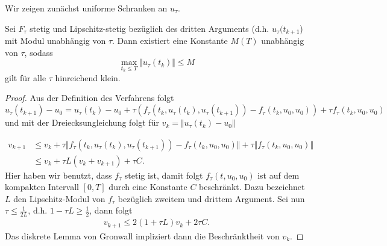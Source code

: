 Wir zeigen zunächst uniforme Schranken an $u_\tau$.
%
\begin{lemma}{}{}
Sei $F_\tau$ stetig und Lipschitz-stetig bezüglich des dritten Arguments (d.h. $u_\tau(t_{k+1}$) mit Modul unabhängig von $\tau$. Dann existiert eine Konstante $M(T)$ unabhängig von $\tau$, sodass
$$ \max_{t_k \leq T} \Vert u_\tau(t_k) \Vert \leq M $$
gilt für alle $\tau$ hinreichend klein.
\end{lemma}
%
\begin{proof}
Aus der Definition des Verfahrens folgt 
$$ u_\tau(t_{k+1})-u_0 = u_\tau(t_k) - u_0 + \tau (f_\tau(t_k,u_\tau(t_k),u_\tau(t_{k+1}))-f_\tau(t_k,u_0,u_0)) + \tau f_\tau(t_k,u_0,u_0) $$
und mit der Dreiecksungleichung folgt für $v_k = \Vert u_\tau(t_k) - u_0 \Vert$

\begin{align*} v_{k+1} &\leq v_k + \tau \Vert f_\tau(t_k,u_\tau(t_k),u_\tau(t_{k+1}))-f_\tau(t_k,u_0,u_0) \Vert + \tau \Vert f_\tau(t_k,u_0,u_0) \Vert \\
&\leq  v_k + \tau L (v_k + v_{k+1}) + \tau C. 
\end{align*}
%
Hier haben wir benutzt, dass $f_\tau$ stetig ist, damit folgt $ f_\tau(t,u_0,u_0) $ ist auf dem kompakten Intervall  $[0,T]$ durch eine Konstante $C$ beschränkt. Dazu bezeichnet $L$ den Lipschitz-Modul von $f_\tau$ bezüglich zweitem und drittem Argument. Sei nun $\tau \leq \frac{1}{2L}$, d.h. $1- \tau L \geq \frac{1}2$, dann folgt
%
\begin{align*}
v_{k+1} \leq 2(1+\tau L) v_k + 2 \tau C.
\end{align*}
Das diskrete Lemma von Gronwall impliziert dann die Beschränktheit von $v_k$.
\end{proof}

